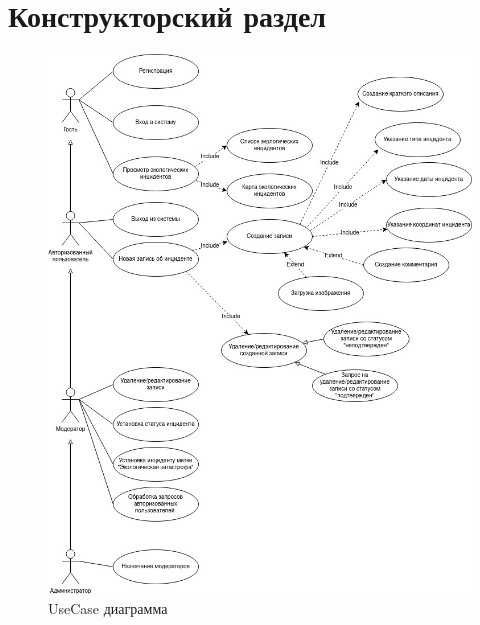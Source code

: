 \chapter{Конструкторский раздел}


\begin{figure}[h]
	\begin{center}
		\includegraphics[scale=0.5]{img/usecase.jpg}
		\caption{UseCase диаграмма}
	\end{center}
\end{figure}